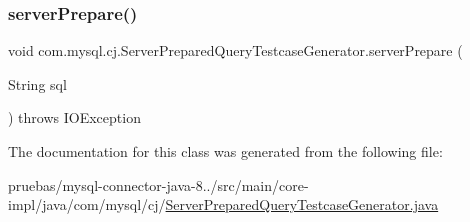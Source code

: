 \subsubsection{\texorpdfstring{server\+Prepare()}{serverPrepare()}}
{\footnotesize\ttfamily void com.\+mysql.\+cj.\+Server\+Prepared\+Query\+Testcase\+Generator.\+server\+Prepare (\begin{DoxyParamCaption}\item[{String}]{sql }\end{DoxyParamCaption}) throws I\+O\+Exception}



The documentation for this class was generated from the following file\+:\begin{DoxyCompactItemize}
\item 
pruebas/mysql-\/connector-\/java-\/8../src/main/core-\/impl/java/com/mysql/cj/\mbox{\hyperlink{_server_prepared_query_testcase_generator_8java}{Server\+Prepared\+Query\+Testcase\+Generator.\+java}}\end{DoxyCompactItemize}
